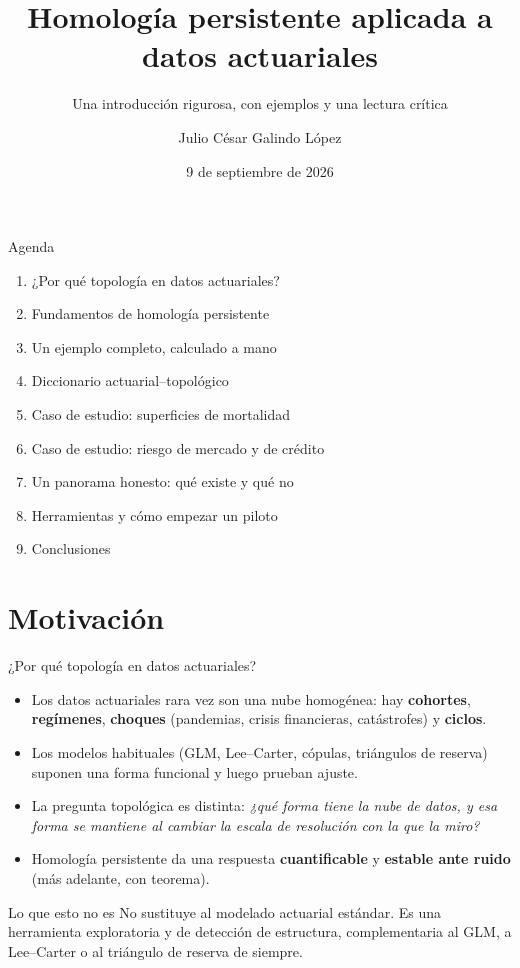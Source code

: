 \documentclass[aspectratio=169,11pt]{beamer}
\title{\textbf{Homología persistente aplicada a datos actuariales}}
\subtitle{Una introducción rigurosa, con ejemplos y una lectura crítica}
\author{Julio César Galindo López}
\institute{CONAC \\ Universidad Panamericana, Ciudad UP}
\date{9 de septiembre de 2026}
\newcommand{\defterm}[1]{\textbf{\color{accent}#1}}
\begin{document}
\begin{frame}
  \titlepage
\end{frame}

\begin{frame}{Agenda}
  \begin{enumerate}
    \setlength{\itemsep}{0.6em}
    \item ¿Por qué topología en datos actuariales?
    \item Fundamentos de homología persistente
    \item Un ejemplo completo, calculado a mano
    \item Diccionario actuarial--topológico
    \item Caso de estudio: superficies de mortalidad
    \item Caso de estudio: riesgo de mercado y de crédito
    \item Un panorama honesto: qué existe y qué no
    \item Herramientas y cómo empezar un piloto
    \item Conclusiones
  \end{enumerate}
\end{frame}

\section{Motivación}
\begin{frame}{¿Por qué topología en datos actuariales?}
  \begin{itemize}
    \item Los datos actuariales rara vez son una nube homogénea: hay
      \defterm{cohortes}, \defterm{regímenes}, \defterm{choques} (pandemias,
      crisis financieras, catástrofes) y \defterm{ciclos}.
    \item Los modelos habituales (GLM, Lee--Carter, cópulas, triángulos de
      reserva) suponen una forma funcional y luego prueban ajuste.
    \item La pregunta topológica es distinta: \textit{¿qué forma tiene la
      nube de datos, y esa forma se mantiene al cambiar la escala de
      resolución con la que la miro?}
    \item Homología persistente da una respuesta \textbf{cuantificable} y
      \textbf{estable ante ruido} (más adelante, con teorema).
  \end{itemize}
  \vspace{0.5em}
  \begin{block}{Lo que esto no es}
    No sustituye al modelado actuarial estándar. Es una herramienta
    exploratoria y de detección de estructura, complementaria al GLM, a
    Lee--Carter o al triángulo de reserva de siempre.
  \end{block}
\end{frame}
\end{document}
